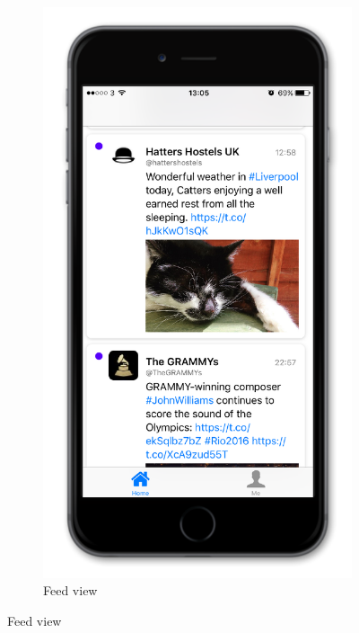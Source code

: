 \documentclass{article}
\begin{document}
\begin{figure}[H]
\begin{subfigure}[b]{0.48\textwidth}
        \includegraphics[width=\textwidth]{iphone_6_feed}
        \caption{Feed view}
    \end{subfigure}
    
    \vspace{1em}
    

\end{figure}
\end{document}
